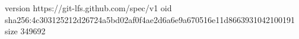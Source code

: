 version https://git-lfs.github.com/spec/v1
oid sha256:4c303125212d26724a5bd02af0f4ae2d6a6e9a670516e11d8663931042100191
size 349692

